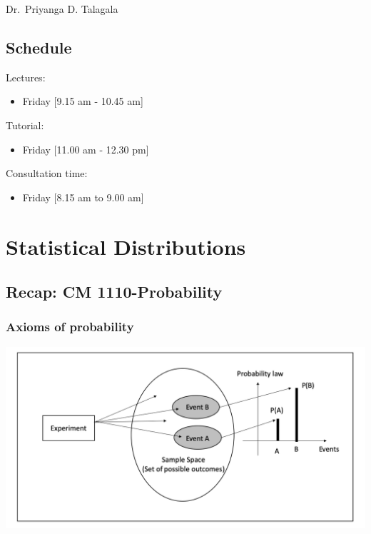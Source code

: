 \documentclass[]{book}
\providecommand{\tightlist}{%
  \setlength{\itemsep}{0pt}\setlength{\parskip}{0pt}}
\begin{document}
Dr.~Priyanga D. Talagala

\hypertarget{schedule}{%
\section*{Schedule}\label{schedule}}

Lectures:

\begin{itemize}
\tightlist
\item
  Friday {[}9.15 am - 10.45 am{]}
\end{itemize}

Tutorial:

\begin{itemize}
\tightlist
\item
  Friday {[}11.00 am - 12.30 pm{]}
\end{itemize}

Consultation time:

\begin{itemize}
\tightlist
\item
  Friday {[}8.15 am to 9.00 am{]}
\end{itemize}

\hypertarget{statistical-distributions}{%
\chapter{Statistical Distributions}\label{statistical-distributions}}


\hypertarget{recap-cm-1110-probability}{%
\section*{Recap: CM 1110-Probability}\label{recap-cm-1110-probability}}

\hypertarget{axioms-of-probability}{%
\subsection*{Axioms of probability}\label{axioms-of-probability}}

\begin{center}\includegraphics[width=1\linewidth]{figure/Axioms} \end{center}
\end{document}
